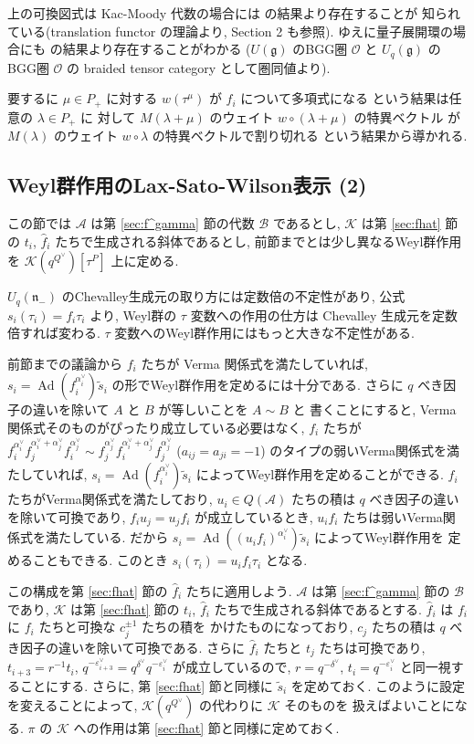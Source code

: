 \documentclass[12pt,twoside,dvipdfm]{msjproc}
\theoremstyle{definition} %
\theoremstyle{definition} %
\theoremstyle{definition} %
\numberwithin{theorem}{section}
\numberwithin{equation}{section}
\numberwithin{figure}{section}
\numberwithin{table}{section}
\newcommand\secref[1]{第 \ref{#1} 節}
\newcommand\g{\mathfrak{g}}
\newcommand\nil{\mathfrak{n}}
\newcommand\A{\mathcal{A}}
\newcommand\K{\mathcal{K}}
\newcommand\B{\mathcal{B}}
\newcommand\Ad{\mathop{\mathrm{Ad}}\nolimits}
\newcommand\ts{{\tilde{s}}}
\newcommand\hf{{\hat{f}}}
\newcommand\ev{\varepsilon^\vee}
\newcommand\av{\alpha^\vee}
\newcommand\dv{\delta^\vee}
\newcommand\Qv{{Q^\vee}}
\newcommand\cO{{\mathcal{O}}}
\begin{document}
上の可換図式は Kac-Moody 代数の場合には \cite{DGK} の結果より存在することが
知られている(translation functor の理論より, \cite{KW} Section 2 も参照).
ゆえに量子展開環の場合にも \cite{EK-VI} の結果より存在することがわかる
($U(\g)$ のBGG圏 $\cO$ と $U_q(\g)$ のBGG圏 $\cO$ 
の braided tensor category として圏同値より).

要するに $\mu\in P_+$ に対する $w(\tau^\mu)$ が $f_i$ について多項式になる
という結果は任意の $\lambda\in P_+$ に
対して $M(\lambda+\mu)$ のウェイト $w\circ(\lambda+\mu)$ の特異ベクトル
が $M(\lambda)$ のウェイト $w\circ\lambda$ の特異ベクトルで割り切れる
という結果から導かれる.



\subsection{Weyl群作用のLax-Sato-Wilson表示 (2)}
\label{sec:Sato-Wilson-2}

この節では $\A$ は\secref{sec:f^gamma}の代数 $\B$ であるとし, 
$\K$ は\secref{sec:fhat}の $t_i$, $\hf_i$ たちで生成される斜体であるとし, 
前節までとは少し異なるWeyl群作用を $\K(q^\Qv)[\tau^P]$ 上に定める.

$U_q(\nil_-)$ のChevalley生成元の取り方には定数倍の不定性があり, 
公式 $s_i(\tau_i)=f_i\tau_i$ より, 
Weyl群の $\tau$ 変数への作用の仕方は Chevalley 生成元を定数倍すれば変わる.
$\tau$ 変数へのWeyl群作用にはもっと大きな不定性がある.

前節までの議論から $f_i$ たちが Verma 関係式を満たしていれば, 
$s_i=\Ad(f_i^{\av_i})\ts_i$ の形でWeyl群作用を定めるには十分である.
さらに $q$ べき因子の違いを除いて $A$ と $B$ が等しいことを $A\sim B$ と
書くことにすると, Verma関係式そのものがぴったり成立している必要はなく, 
$f_i$ たちが \(
      f_i^{\av_i} f_j^{\av_i+\av_j} f_i^{\av_j}
 \sim f_j^{\av_j} f_i^{\av_i+\av_j} f_j^{\av_j}
\) ($a_{ij}=a_{ji}=-1$) のタイプの弱いVerma関係式を満たしていれば, 
$s_i=\Ad(f_i^{\av_i})\ts_i$ によってWeyl群作用を定めることができる.
$f_i$ たちがVerma関係式を満たしており, 
$u_i\in Q(\A)$ たちの積は $q$ べき因子の違いを除いて可換であり, 
$f_iu_j=u_jf_i$ が成立しているとき, 
$u_if_i$ たちは弱いVerma関係式を満たしている.
だから $s_i=\Ad((u_if_i)^{\av_i})\ts_i$ によってWeyl群作用を
定めることもできる. このとき $s_i(\tau_i)=u_if_i\tau_i$ となる.

この構成を\secref{sec:fhat}の $\hf_i$ たちに適用しよう.
$\A$ は\secref{sec:f^gamma}の $\B$ であり, 
$\K$ は\secref{sec:fhat}の $t_i$, $\hf_i$ たちで生成される斜体であるとする.
$\hf_i$ は $f_i$ に $f_i$ たちと可換な $c_j^{\pm1}$ たちの積を
かけたものになっており, $c_j$ たちの積は $q$ べき因子の違いを除いて可換である.
さらに $\hf_i$ たちと $t_j$ たちは可換であり, $t_{i+3}=r^{-1}t_i$, 
$q^{-\ev_{i+3}}=q^{\dv}q^{-\ev_i}$ が成立しているので, 
$r=q^{-\dv}$, $t_i=q^{-\ev_i}$ と同一視することにする.
さらに, \secref{sec:fhat}と同様に $\ts_i$ を定めておく.
このように設定を変えることによって, $\K(q^\Qv)$ の代わりに $\K$ そのものを
扱えばよいことになる.
$\pi$ の $\K$ への作用は\secref{sec:fhat}と同様に定めておく.
\end{document}
